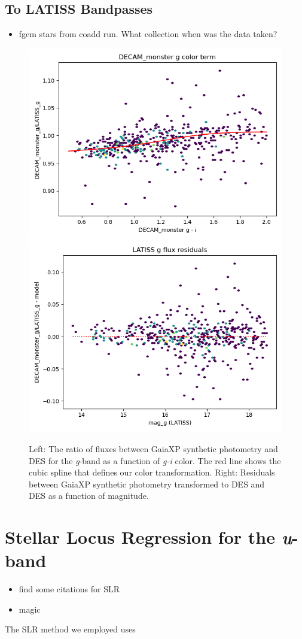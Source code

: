 \subsection{To LATISS Bandpasses}
\begin{itemize}
    \item fgcm stars from coadd run. What collection when was the data taken? 
\end{itemize}
\begin{figure}
    \includegraphics[width=0.49\linewidth]{./figures/color_terms/DECam_monster_to_LATISS_band_g_color_term.png}
    \includegraphics[width=0.49\linewidth]{./figures/color_terms/DECam_monster_to_LATISS_band_g_flux_residuals.png}
    \caption{Left: The ratio of fluxes between GaiaXP synthetic photometry and DES for the \textit{g}-band as a function of \textit{g-i} color. The red line shows the cubic spline that defines our color transformation.
    Right: Residuals between GaiaXP synthetic photometry transformed to DES and DES as a function of magnitude.}
    \label{fig:color-des-latiss-g}
\end{figure}

\section{Stellar Locus Regression for the \textit{u}-band}
\label{sec:slr}

\begin{itemize}
    \item find some citations for SLR
    \item magic 
\end{itemize}
The SLR method we employed uses 

